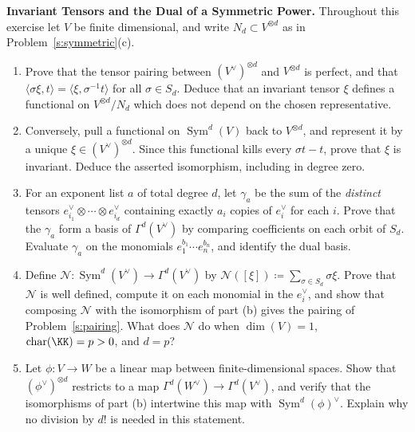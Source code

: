 \documentclass[12pt,reqno]{amsart}
\DeclareMathOperator{\Sym}{Sym}
\begin{document}
\begin{problems}
\item\label{s:divided} \textbf{Invariant Tensors and the Dual of a Symmetric Power.} Throughout this exercise let $V$ be finite dimensional, and write $N_d\subset V^{\otimes d}$ as in Problem~\ref{s:symmetric}(c).
\begin{enumerate}
\item Prove that the tensor pairing between $(V^{\vee})^{\otimes d}$ and $V^{\otimes d}$ is perfect, and that $\langle\sigma\xi,t\rangle=\langle\xi,\sigma^{-1}t\rangle$ for all $\sigma\in S_d$. Deduce that an invariant tensor $\xi$ defines a functional on $V^{\otimes d}/N_d$ which does not depend on the chosen representative.
\item Conversely, pull a functional on $\Sym^d(V)$ back to $V^{\otimes d}$, and represent it by a unique $\xi\in(V^{\vee})^{\otimes d}$. Since this functional kills every $\sigma t-t$, prove that $\xi$ is invariant. Deduce the asserted isomorphism, including in degree zero.
\item For an exponent list $a$ of total degree $d$, let $\gamma_a$ be the sum of the \emph{distinct} tensors $e_{i_1}^{\vee}\otimes\cdots\otimes e_{i_d}^{\vee}$ containing exactly $a_i$ copies of $e_i^{\vee}$ for each $i$. Prove that the $\gamma_a$ form a basis of $\Gamma^d(V^{\vee})$ by comparing coefficients on each orbit of $S_d$. Evaluate $\gamma_a$ on the monomials $e_1^{b_1}\cdots e_n^{b_n}$, and identify the dual basis.
\item Define $\mathcal N:\Sym^d(V^{\vee})\to\Gamma^d(V^{\vee})$ by $\mathcal N([\xi])\coloneqq\sum_{\sigma\in S_d}\sigma\xi$. Prove that $\mathcal N$ is well defined, compute it on each monomial in the $e_i^{\vee}$, and show that composing $\mathcal N$ with the isomorphism of part (b) gives the pairing of Problem~\ref{s:pairing}. What does $\mathcal N$ do when $\dim(V)=1$, $\operatorname{char}(\KK)=p>0$, and $d=p$?
\item Let $\phi:V\to W$ be a linear map between finite-dimensional spaces. Show that $(\phi^{\vee})^{\otimes d}$ restricts to a map $\Gamma^d(W^{\vee})\to\Gamma^d(V^{\vee})$, and verify that the isomorphisms of part (b) intertwine this map with $\Sym^d(\phi)^{\vee}$. Explain why no division by $d!$ is needed in this statement.
\end{enumerate}
\end{problems}

\hrulefill
\end{document}
